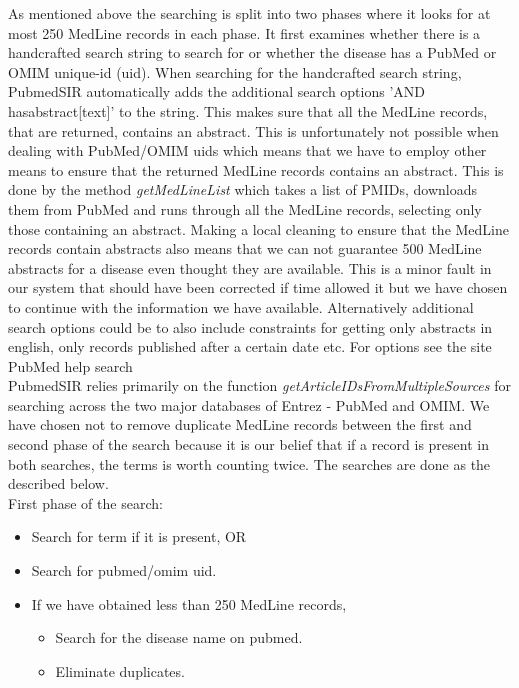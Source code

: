 As mentioned above the searching is split into two phases where it
looks for at most 250 MedLine records in each phase. It first examines
whether there is a handcrafted search string to search for or whether
the disease has a PubMed or OMIM unique-id (uid). When searching for
the handcrafted search string, PubmedSIR automatically adds the
additional search options 'AND hasabstract[text]' to the string. This
makes sure that all the MedLine records, that are returned, contains
an abstract. This is unfortunately not possible when dealing with
PubMed/OMIM uids which means that we have to employ other means to
ensure that the returned MedLine records contains an abstract. This is
done by the method \textit{getMedLineList} which takes a list of
PMIDs, downloads them from PubMed and runs through all the MedLine
records, selecting only those containing an abstract. Making a local
cleaning to ensure that the MedLine records contain abstracts also
means that we can not guarantee 500 MedLine abstracts for a disease
even thought they are available. This is a minor fault in our system
that should have been corrected if time allowed it but we have chosen
to continue with the information we have available. Alternatively
additional search options could be to also include constraints for
getting only abstracts in english, only records published after a
certain date etc. For options see the site PubMed help search
\cite{PubmedHelpSearch}\\

PubmedSIR relies primarily on the function \textit{getArticleIDsFromMultipleSources} for searching across the two major databases of Entrez - PubMed and OMIM. We have chosen not to remove duplicate MedLine records between the first and second phase of the search because it is our belief that if a record is present in both searches, the terms is worth counting twice. The searches are done as the described below. \\

First phase of the search:
\begin{itemize}

\item Search for term if it is present, OR

\item Search for pubmed/omim uid.

\item If we have obtained less than 250 MedLine records,
  
\begin{itemize}

  \item Search for the disease name on pubmed.

  \item Eliminate duplicates.

  \end{itemize}
\end{itemize}

